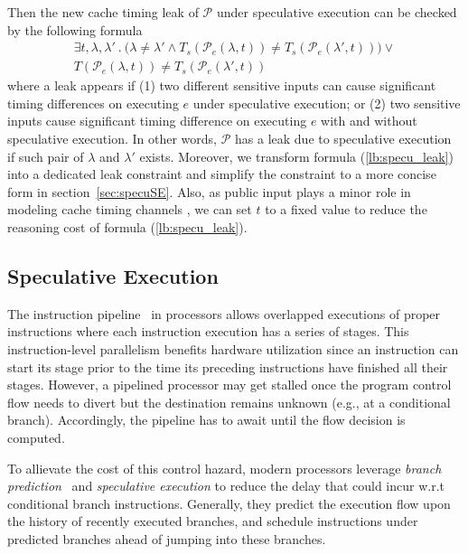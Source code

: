 \documentclass[sigconf, review]{acmart}
\newcommand\ignore[1]{}
\newcommand{\prog}{\mathcal{P}}
\begin{document}
Then the new cache timing leak of $\prog$ under speculative execution can be 
checked by the following formula 
%
\begin{multline}
\label{lb:specu_leak}
\mathit{\exists t,\lambda,\lambda'~.~
	\big(
			\lambda \neq \lambda' \wedge T_{s}({\prog_e}(\lambda,t)) 
			\neq T_{s}({\prog_e}(\lambda',t))}
	\big)
	\vee 
	\\  
	T({\prog_e}(\lambda,t)) \neq T_{s}({\prog_e}(\lambda',t)) ~~~
\end{multline}
%
where a leak appears if (1) two different sensitive inputs can cause significant 
timing differences on executing $\mathit{e}$ under speculative execution; or (2) 
two sensitive inputs cause significant timing difference on executing $\mathit{e}$ 
with and without speculative execution. In other words, $\prog$ has a leak due to 
speculative execution if such pair of $\lambda$ and $\lambda'$ exists. Moreover, 
we transform formula (\ref{lb:specu_leak}) into a dedicated leak constraint and 
simplify the constraint to a more concise form in section~\ref{sec:specuSE}. Also, 
as public input plays a minor role in modeling cache timing channels
\cite{WangBLWZW19}, we can set $t$ to a fixed value to reduce the reasoning cost 
of formula (\ref{lb:specu_leak}). 

\ignore{
Also, we assume $\prog$ has the same set of instructions on each program path and 
speculative execution only changes the cache state. 
}





\subsection{Speculative Execution}
\label{sec:specu}

The instruction pipeline~\cite{RamamoorthyL77} in processors allows overlapped 
executions of proper instructions where each instruction execution has a series 
of stages. This instruction-level parallelism benefits hardware utilization since 
an instruction can start its stage prior to the time its preceding instructions 
have finished all their stages. However, a pipelined processor may get stalled 
once the program control flow needs to divert but the destination remains unknown 
(e.g., at a conditional branch). Accordingly, the pipeline has to await until 
the flow decision is computed.


To allievate the cost of this control hazard, modern processors leverage 
\textit{branch prediction}~\cite{Mittal19} and \textit{speculative execution}
\cite{kimuraKT1996} to reduce the delay that could incur w.r.t conditional branch 
instructions. Generally, they predict the execution flow upon the history of 
recently executed branches, and schedule instructions under predicted branches
ahead of jumping into these branches. 
\end{document}

